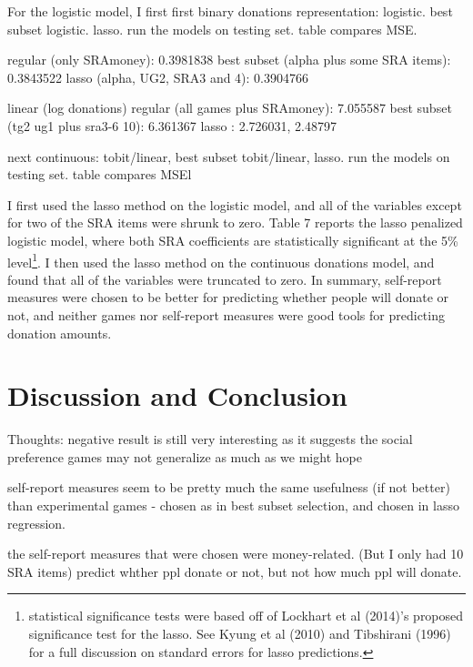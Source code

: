 \documentclass[12pt]{article}
\begin{document}
For the logistic model, I first 
first binary donations representation: logistic. best subset logistic. lasso. run the models on testing set. table compares MSE.

regular (only SRAmoney): 0.3981838
best subset (alpha plus some SRA items): 0.3843522
lasso (alpha, UG2, SRA3 and 4): 0.3904766


linear (log donations)
regular (all games plus SRAmoney): 7.055587
best subset (tg2 ug1 plus sra3-6 10): 6.361367
lasso : 2.726031, 2.48797

next continuous: tobit/linear, best subset tobit/linear, lasso. run the models on testing set. table compares MSEl












I first used the lasso method on the logistic model, and all of the variables except for two of the SRA items were shrunk to zero. Table 7 reports the lasso penalized logistic model, where both SRA coefficients are statistically significant at the 5\% level\footnote{statistical significance tests were based off of Lockhart et al (2014)\rq s proposed significance test for the lasso. See Kyung et al (2010) and Tibshirani (1996) for a full discussion on standard errors for lasso predictions.}. I then used the lasso method on the continuous donations model, and found that all of the variables were truncated to zero. In summary, self-report measures were chosen to be better for predicting whether people will donate or not, and neither games nor self-report measures were good tools for predicting donation amounts.



\section{Discussion and Conclusion}

Thoughts:
negative result is still very interesting as it suggests the social preference games may not generalize as much as we might hope

self-report measures seem to be pretty much the same usefulness (if not better) than experimental games - chosen as in best subset selection, and chosen in lasso regression.

the self-report measures that were chosen were money-related. (But I only had 10 SRA items)
predict whther ppl donate or not, but not how much ppl will donate.
\end{document}
